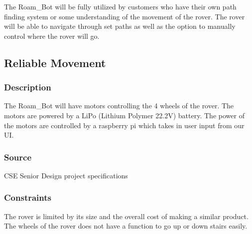 
The Roam\_Bot will be fully utilized by customers who have their own path finding system or some understanding of the movement of the rover. The rover will be able to navigate through set paths as well as the option to manually control where the rover will go.

\subsection{Reliable Movement}
\subsubsection{Description}
The Roam\_Bot will have motors controlling the 4 wheels of the rover. The motors are powered by a LiPo (Lithium Polymer 22.2V) battery. The power of the motors are controlled by a raspberry pi which takes in user input from our UI. 
\subsubsection{Source}
 CSE Senior Design project specifications
\subsubsection{Constraints}
The rover is limited by its size and the overall cost of making a similar product. The wheels of the rover does not have a function to go up or down stairs easily.

